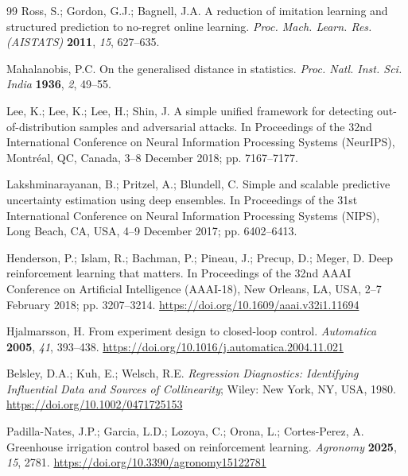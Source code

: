 \begin{thebibliography}{99}
Ross, S.; Gordon, G.J.; Bagnell, J.A. A reduction of imitation learning and structured
prediction to no-regret online learning. \textit{Proc. Mach. Learn. Res. (AISTATS)}
\textbf{2011}, \textit{15}, 627--635.

Mahalanobis, P.C. On the generalised distance in statistics. \textit{Proc. Natl. Inst. Sci.
India} \textbf{1936}, \textit{2}, 49--55.

Lee, K.; Lee, K.; Lee, H.; Shin, J. A simple unified framework for detecting
out-of-distribution samples and adversarial attacks. In Proceedings of the 32nd International
Conference on Neural Information Processing Systems (NeurIPS), Montr\'eal, QC, Canada,
3--8 December 2018; pp. 7167--7177.

Lakshminarayanan, B.; Pritzel, A.; Blundell, C. Simple and scalable predictive uncertainty
estimation using deep ensembles. In Proceedings of the 31st International Conference on
Neural Information Processing Systems (NIPS), Long Beach, CA, USA, 4--9 December 2017;
pp. 6402--6413.

Henderson, P.; Islam, R.; Bachman, P.; Pineau, J.; Precup, D.; Meger, D. Deep reinforcement
learning that matters. In Proceedings of the 32nd AAAI Conference on Artificial Intelligence
(AAAI-18), New Orleans, LA, USA, 2--7 February 2018; pp. 3207--3214.
\url{https://doi.org/10.1609/aaai.v32i1.11694}

Hjalmarsson, H. From experiment design to closed-loop control. \textit{Automatica}
\textbf{2005}, \textit{41}, 393--438.
\url{https://doi.org/10.1016/j.automatica.2004.11.021}

Belsley, D.A.; Kuh, E.; Welsch, R.E. \textit{Regression Diagnostics: Identifying Influential
Data and Sources of Collinearity}; Wiley: New York, NY, USA, 1980.
\url{https://doi.org/10.1002/0471725153}

Padilla-Nates, J.P.; Garcia, L.D.; Lozoya, C.; Orona, L.; Cortes-Perez, A.
Greenhouse irrigation control based on reinforcement learning. \textit{Agronomy}
\textbf{2025}, \textit{15}, 2781.
\url{https://doi.org/10.3390/agronomy15122781}

\end{thebibliography}


